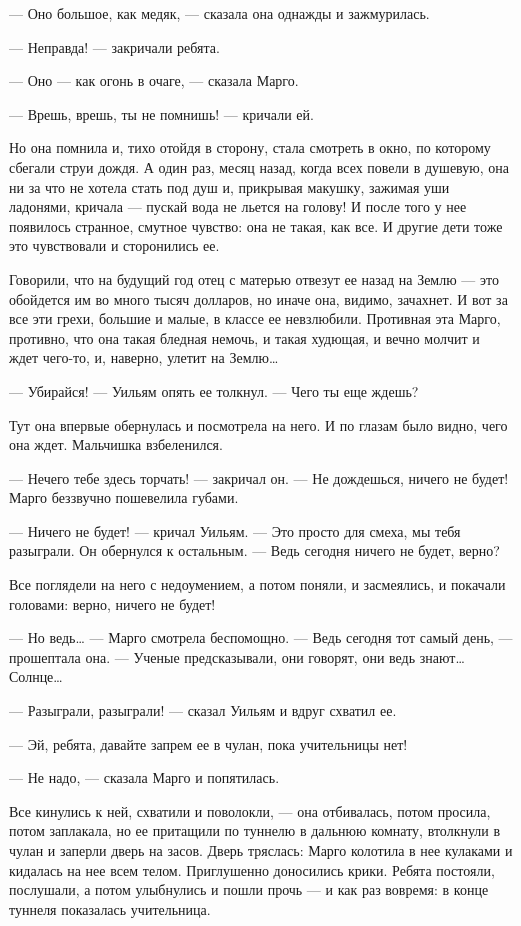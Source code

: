 — Оно большое, как медяк, — сказала она однажды и зажмурилась.

— Неправда! — закричали ребята.

— Оно — как огонь в очаге, — сказала Марго.

— Врешь, врешь, ты не помнишь! — кричали ей.

Но она помнила и, тихо отойдя в сторону, стала смотреть в окно, по которому
сбегали струи дождя. А один раз, месяц назад, когда всех повели в душевую, она
ни за что не хотела стать под душ и, прикрывая макушку, зажимая уши ладонями,
кричала — пускай вода не льется на голову! И после того у нее появилось
странное, смутное чувство: она не такая, как все. И другие дети тоже это
чувствовали и сторонились ее.

Говорили, что на будущий год отец с матерью отвезут ее назад на Землю — это
обойдется им во много тысяч долларов, но иначе она, видимо, зачахнет. И вот за
все эти грехи, большие и малые, в классе ее невзлюбили. Противная эта Марго,
противно, что она такая бледная немочь, и такая худющая, и вечно молчит и ждет
чего-то, и, наверно, улетит на Землю…

— Убирайся! — Уильям опять ее толкнул. — Чего ты еще ждешь?

Тут она впервые обернулась и посмотрела на него. И по глазам было видно, чего
она ждет. Мальчишка взбеленился.

— Нечего тебе здесь торчать! — закричал он. — Не дождешься, ничего не будет!
Марго беззвучно пошевелила губами.

— Ничего не будет! — кричал Уильям. — Это просто для смеха, мы тебя разыграли.
Он обернулся к остальным. — Ведь сегодня ничего не будет, верно?

Все поглядели на него с недоумением, а потом поняли, и засмеялись, и покачали
головами: верно, ничего не будет!

— Но ведь… — Марго смотрела беспомощно. — Ведь сегодня тот самый день, —
прошептала она. — Ученые предсказывали, они говорят, они ведь знают… Солнце…

— Разыграли, разыграли! — сказал Уильям и вдруг схватил ее.

— Эй, ребята, давайте запрем ее в чулан, пока учительницы нет!

— Не надо, — сказала Марго и попятилась.

Все кинулись к ней, схватили и поволокли, — она отбивалась, потом просила,
потом заплакала, но ее притащили по туннелю в дальнюю комнату, втолкнули в
чулан и заперли дверь на засов. Дверь тряслась: Марго колотила в нее кулаками и
кидалась на нее всем телом. Приглушенно доносились крики. Ребята постояли,
послушали, а потом улыбнулись и пошли прочь — и как раз вовремя: в конце
туннеля показалась учительница.

